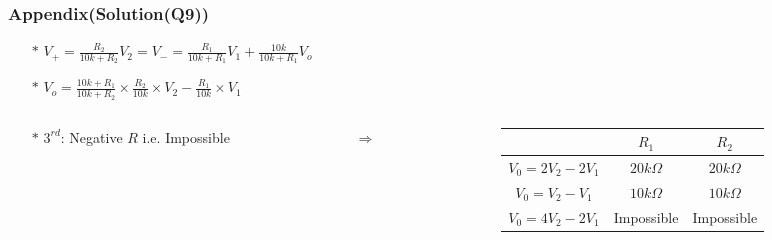\documentclass{beamer}
\begin{document}
\begin{frame}
\frametitle{Appendix(Solution(Q9))}
\begin{itemize} \itemsep1pt \parskip0pt 
  \item[$\ast$] $V_+ = \frac{R_2}{10k+R_2}V_2 = V_- = \frac{R_1}{10k+R_1}V_1+\frac{10k}{10k+R_1}V_o$
  \item[$\ast$] $V_o = \frac{10k+R_1}{10k+R_2} \times \frac{R_2}{10k} \times V_2 - \frac{R_1}{10k} \times V_1$
\end{itemize}

\begin{columns}
\begin{column}{4cm}

\begin{itemize} \itemsep1pt \parskip0pt 
  \item[$\ast$] $3^{rd}$: Negative $R$ i.e. Impossible
\end{itemize}

\end{column}

\begin{column}{1cm}

\centerline{$\Rightarrow$}

\end{column}

\begin{column}{8cm}

\begin{table}
\begin{center}
\def\arraystretch{1.5}

\begin{tabular}{|c|c|c|}
\hline
{} & ~~{\bf $R_1$}~~ & ~~{\bf $R_2$}~~ \\ 
\hline
$V_0 = 2V_2-2V_1$ & $20k\Omega$ & $20k\Omega$ \\
\hline
$V_0 = V_2 - V_1$ & $10k\Omega$ & $10k\Omega$ \\
\hline
$V_0 = 4V_2-2V_1$ & Impossible & Impossible \\
\hline
\end{tabular}
\end{center}
\end{table}

\end{column}
\end{columns}
\end{frame}

\end{document}
